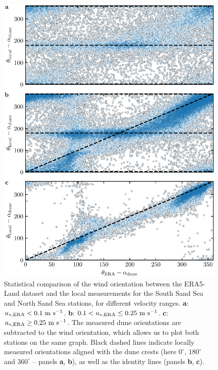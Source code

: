 \begin{figure}[p]
\centering
\includegraphics[scale=1]{Figures/Figure9_supp.pdf}
\caption{Statistical comparison of the wind orientation between the ERA5-Land dataset and the local measurements for the South Sand Sea and North Sand Sea stations, for different velocity ranges. \textbf{a}: $u_{*, \textup{\textup{ERA}}} < 0.1~\textup{m}~\textup{s}^{-1}$. \textbf{b}: $0.1 < u_{*, \textup{\textup{ERA}}} \leq 0.25~\textup{m}~\textup{s}^{-1}$. \textbf{c}: $u_{*, \textup{\textup{ERA}}} \geq 0.25~\textup{m}~\textup{s}^{-1}$. The measured dune orientations are subtracted to the wind orientation, which allows us to plot both stations on the same graph. Black dashed lines indicate locally measured orientations aligned with the dune crests (here $0^\circ$, $180^\circ$ and $360^\circ$ -- panels \textbf{a}, \textbf{b}), as well as the identity lines (panels \textbf{b}, \textbf{c}).}
\label{Fig9_supp}
\end{figure}

